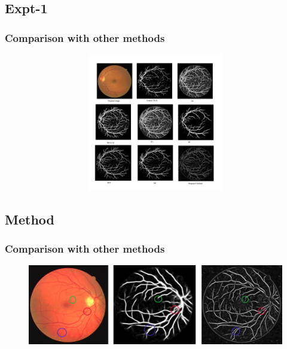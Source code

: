 \documentclass{beamer}
\begin{document}
\subsection{Expt-1}
\begin{frame}
\frametitle{Comparison with other methods}
\begin{figure}
\includegraphics[width=12cm,height=6cm,keepaspectratio]{Images/All_Compare.png}
\end{figure}
\end{frame}

\subsection{Method}
\begin{frame}
\frametitle{Comparison with other methods}
\begin{figure}
\includegraphics[width=1.0\linewidth]{Images/prob2.png}

\end{figure}

\end{frame}
\end{document}
